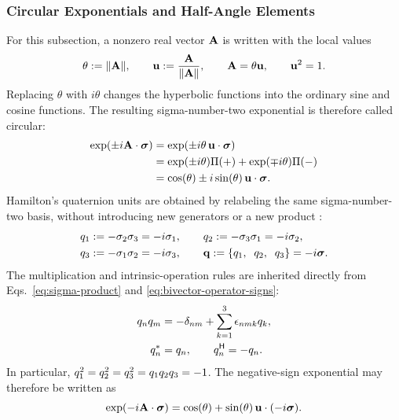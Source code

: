 \subsubsection{Circular Exponentials and Half-Angle Elements}
For this subsection, a nonzero real vector \(\mathbf{A}\) is written with the
local values
\[
\theta:=\|\mathbf{A}\|,
\qquad
\mathbf{u}:=\frac{\mathbf{A}}{\|\mathbf{A}\|},
\qquad
\mathbf{A}=\theta\mathbf{u},
\qquad
\mathbf{u}^2=1.
\]
Replacing \(\theta\) with \(i\theta\) changes the hyperbolic functions into
the ordinary sine and cosine functions. The resulting sigma-number-two
exponential is therefore called circular:
\begin{align}
\exp(\pm i\mathbf{A}\cdot\mathbf{\bm{\sigma}})
&= \exp(\pm i\theta\,\mathbf{u}\cdot\mathbf{\bm{\sigma}})\notag \\
&= \exp(\pm i\theta)\Pi(+) + \exp(\mp i\theta)\Pi(-)\notag \\
&= \cos(\theta) \pm i\sin(\theta)\,\mathbf{u}\cdot\mathbf{\bm{\sigma}}.
\label{eq:exp-bivector}
\end{align}
Hamilton's quaternion units are obtained by relabeling the same
sigma-number-two basis, without introducing new generators or a new product
\cite{hamilton1844}:
\begin{equation}
\begin{aligned}
q_1&:=-\sigma_2\sigma_3=-i\sigma_1,\qquad
q_2:=-\sigma_3\sigma_1=-i\sigma_2,\\
q_3&:=-\sigma_1\sigma_2=-i\sigma_3,\qquad
\mathbf{q}:=\left\{q_1,\mkern10mu q_2,\mkern10mu q_3\right\}=-i\mathbf{\bm{\sigma}}.
\end{aligned}
\label{eq:quaternion-basis}
\end{equation}
The multiplication and intrinsic-operation rules are inherited directly from
Eqs.\ \eqref{eq:sigma-product} and \eqref{eq:bivector-operator-signs}:
\begin{equation}
\begin{aligned}
q_nq_m
&=-\delta_{nm}+\sum_{k=1}^{3}\epsilon_{nmk}q_k,\\
q_n^{*}&=q_n,\qquad
q_n^{\mathsf H}=-q_n.
\end{aligned}
\label{eq:quaternion-basis-properties}
\end{equation}
In particular,
\(q_1^2=q_2^2=q_3^2
=q_1q_2q_3=-1\).
The negative-sign exponential may therefore be written as
\begin{equation*}
\exp(-i\mathbf{A}\cdot\mathbf{\bm{\sigma}})
=\cos(\theta)+\sin(\theta)\,\mathbf{u}\cdot(-i\mathbf{\bm{\sigma}}).
\end{equation*}
